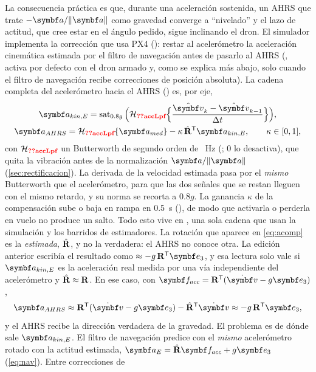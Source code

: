 La consecuencia práctica es que, durante una aceleración sostenida, un AHRS
que trate $-\vect a/\|\vect a\|$ como gravedad converge a ``nivelado'' y el
lazo de actitud, que cree estar en el ángulo pedido, sigue inclinando el
dron. El simulador implementa la corrección que usa PX4 ():
restar al acelerómetro la aceleración cinemática estimada por el filtro de
navegación antes de pasarlo al AHRS (,
activa por defecto con el dron armado y, como se explica más abajo, solo
cuando el filtro de navegación recibe correcciones de posición absoluta). La
cadena completa del acelerómetro
hacia el AHRS () es, por eje,
\begin{gather}
\vect a_{kin,E} = \operatorname{sat}_{0.8g}\Big(\mathcal{H}_{\val{accLpf}}\Big\{\frac{\hat{\vect v}_k-\hat{\vect v}_{k-1}}{\Delta t}\Big\}\Big),\label{eq:akin}\\
\vect a_{AHRS} = \mathcal{H}_{\val{accLpf}}\{\vect a_{med}\} - \kappa\,\hat\R\T\vect a_{kin,E},\qquad \kappa\in[0,1],\label{eq:acomp}
\end{gather}
con $\mathcal H_{\val{accLpf}}$ un Butterworth de segundo orden de
~Hz (; 0 lo desactiva), que
quita la vibración antes de la normalización $\vect a/\|\vect a\|$
(\cref{sec:rectificacion}). La derivada de la velocidad estimada pasa por el
\emph{mismo} Butterworth que el acelerómetro, para que las dos señales que se
restan lleguen con el mismo retardo, y su norma se recorta a $0.8g$. La
ganancia $\kappa$ de la compensación sube o baja en rampa en 0.5~s
(), de modo que activarla o perderla en vuelo no
produce un salto. Todo esto vive en , una sola
cadena que usan la simulación y los barridos de estimadores. La rotación que
aparece en \eqref{eq:acomp} es
la \emph{estimada}, $\hat{\mathbf{R}}$, y no la verdadera: el AHRS no conoce otra. La
edición anterior escribía el resultado como $\approx-g\,\R\T\eu$, y esa
lectura solo vale si $\vect a_{kin,E}$ es la aceleración real medida por una
vía independiente del acelerómetro y $\hat{\mathbf{R}}\approx\mathbf{R}$. En ese caso, con
$\vect f_{acc}=\R\T(\dot{\vect v}-g\eu)$,
\[
\vect a_{AHRS}\approx\R\T(\dot{\vect v}-g\eu)-\hat\R\T\dot{\vect v}\approx-g\,\R\T\eu ,
\]
y el AHRS recibe la dirección verdadera de la gravedad. El problema es de
dónde sale $\vect a_{kin,E}$. El filtro de navegación predice con el
\emph{mismo} acelerómetro rotado con la actitud estimada,
$\vect a_E=\hat\R\vect f_{acc}+g\eu$ (\cref{eq:nav}). Entre correcciones de

